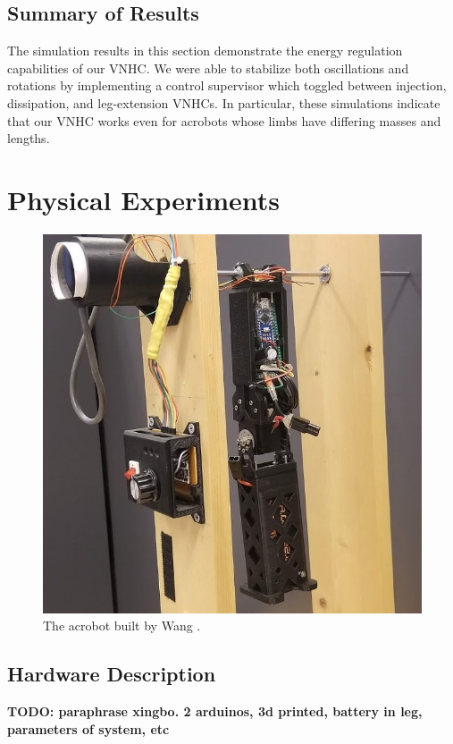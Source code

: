\documentclass[journal,twoside,web]{ieeecolor}
\begin{document}
\subsection{Summary of Results}
The simulation results in this section demonstrate the energy regulation
capabilities of our VNHC.  
We were able to stabilize both oscillations and rotations by implementing a
control supervisor which toggled between injection, dissipation, and
leg-extension VNHCs.
In particular, these simulations indicate that our VNHC
works even for acrobots whose limbs have differing masses and lengths.

\section{Physical Experiments}\label{sec:experiments}

\begin{figure}
    \centering
    \includegraphics[width=0.9\linewidth]{xingbo_acrobot.jpg}
    \caption{The acrobot built by Wang \cite{xingbo_thesis}.}
    \label{fig:xingbo-acrobot}
\end{figure}


\subsection{Hardware Description}
\textbf{TODO: paraphrase xingbo. 2 arduinos, 3d printed, battery in leg,
parameters of system, etc}
\end{document}
